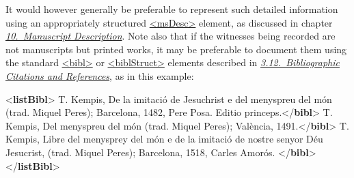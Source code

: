 It would however generally be preferable to represent such detailed information using an appropriately structured \hyperref[TEI.msDesc]{<msDesc>} element, as discussed in chapter \textit{\hyperref[MS]{10.\ Manuscript Description}}. Note also that if the witnesses being recorded are not manuscripts but printed works, it may be preferable to document them using the standard \hyperref[TEI.bibl]{<bibl>} or \hyperref[TEI.biblStruct]{<biblStruct>} elements described in \textit{\hyperref[COBI]{3.12.\ Bibliographic Citations and References}}, as in this example: \par\bgroup{}\exampleFont \begin{shaded}\noindent\mbox{}{<\textbf{listBibl}>}\mbox{}\newline 
{}T. Kempis, De la imitació de Jesuchrist e del\mbox{}\newline 
\hspace*{1em}\hspace*{1em} menyspreu del món (trad. Miquel Peres); Barcelona, 1482, Pere\mbox{}\newline 
\hspace*{1em}\hspace*{1em} Posa. Editio princeps.{</\textbf{bibl}>}\mbox{}\newline 
{}T. Kempis, Del menyspreu del món (trad. Miquel\mbox{}\newline 
\hspace*{1em}\hspace*{1em} Peres); València, 1491.{</\textbf{bibl}>}\mbox{}\newline 
{}T. Kempis, Libre del menysprey del món e de la\mbox{}\newline 
\hspace*{1em}\hspace*{1em} imitació de nostre senyor Déu Jesucrist, (trad. Miquel Peres);\mbox{}\newline 
\hspace*{1em}\hspace*{1em} Barcelona, 1518, Carles Amorós. {</\textbf{bibl}>}\mbox{}\newline 
{</\textbf{listBibl}>}\end{shaded}\egroup\par \par
